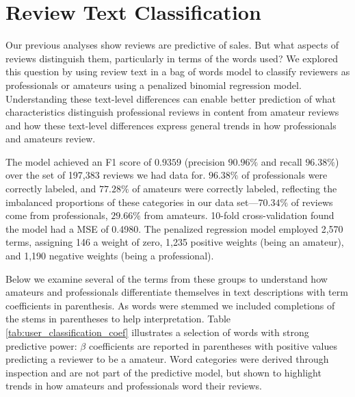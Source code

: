 \documentclass[letterpaper]{article}
\begin{document}



\section{Review Text Classification}
Our previous analyses show reviews are predictive of sales. But what aspects of reviews distinguish them, particularly in terms of the words used? We explored this question by using review text in a bag of words model to classify reviewers as professionals or amateurs using a penalized binomial regression model. Understanding these text-level differences can enable better prediction of what characteristics distinguish professional reviews in content from amateur reviews and how these text-level differences express general trends in how professionals and amateurs review.

The model achieved an F1 score of $0.9359$ (precision $90.96\%$ and recall $96.38\%$) over the set of 197,383 reviews we had data for. $96.38\%$ of professionals were correctly labeled, and $77.28\%$ of amateurs were correctly labeled, reflecting the imbalanced proportions of these categories in our data set---$70.34\%$ of reviews come from professionals, $29.66\%$ from amateurs. 10-fold cross-validation found the model had a MSE of 0.4980. The penalized regression model employed 2,570 terms, assigning 146 a weight of zero, 1,235 positive weights (being an amateur), and 1,190 negative weights (being a professional). 

Below we examine several of the terms from these groups to understand how amateurs and professionals differentiate themselves in text descriptions with term coefficients in parenthesis. As words were stemmed we included completions of the stems in parentheses to help interpretation. Table \ref{tab:user_classification_coef} illustrates a selection of words with strong predictive power: $\beta$ coefficients are reported in parentheses with positive values predicting a reviewer to be a amateur. Word categories were derived through inspection and are not part of the predictive model, but shown to highlight trends in how amateurs and professionals word their reviews. 
\end{document}
